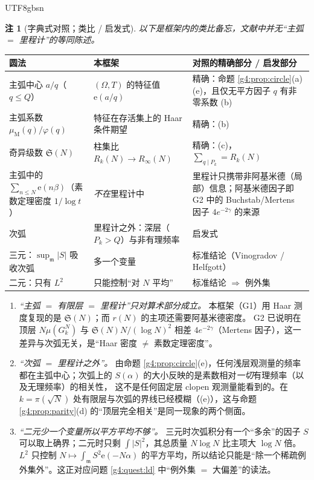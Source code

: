 \documentclass[11pt,a4paper]{article}
\newcommand{\Haar}{\mu}
\newcommand{\Sing}{\mathfrak S}
\newcommand{\Om}{\Omega}               %
\newcommand{\Mob}{\mu_{\mathrm{M}}}    %
\newcommand{\ee}{\mathrm e}
\newcommand{\Min}{\mathfrak m}
\theoremstyle{plain}
\theoremstyle{definition}
\newtheorem{rem}[lem]{注}
\begin{document}
\begin{CJK}{UTF8}{gbsn}
\begin{rem}[字典式对照；类比 / 启发式]\label{g4:rem:dict}
\emph{以下是框架内的类比备忘，文献中并无“主弧 $=$ 里程计”的等同陈述。}
\begin{center}
\begin{tabular}{p{4.6cm}p{4.6cm}p{5.0cm}}
\hline
圆法 & 本框架 & 对照的精确部分 / 启发部分\\
\hline
主弧中心 $a/q$（$q\le Q$） & $(\Om,T)$ 的特征值 $\ee(a/q)$ & 精确：命题 \ref{g4:prop:circle}(a)(e)，且仅无平方因子 $q$ 有非零系数 (b)\\
主弧系数 $\Mob(q)/\varphi(q)$ & 特征在存活集上的 Haar 条件期望 & 精确：(b)\\
奇异级数 $\Sing(N)$ & 柱集比 $R_k(N)\to R_\infty(N)$ & 精确：(c)，$\sum_{q\mid P_k}=R_k(N)$\\
主弧中的 $\sum_{n\le N}\ee(n\beta)$（素数定理密度 $1/\log t$） & \emph{不在}里程计中 & 里程计只携带非阿基米德（局部）信息；阿基米德因子即 G2 中的 Buchstab/Mertens 因子 $4e^{-2\gamma}$ 的来源\\
次弧 & 里程计之外：深层（$P_k>Q$）与非有理频率 & 启发式\\
三元：$\sup_{\Min}|S|$ 吸收次弧 & 多一个变量 & 标准结论（Vinogradov / Helfgott）\\
二元：只有 $L^2$ & 只能控制“对 $N$ 平均” & 标准结论 $\Rightarrow$ 例外集\\
\hline
\end{tabular}
\end{center}
\begin{enumerate}[leftmargin=*,label=(\arabic*)]
\item \emph{“主弧 $=$ 有限层 $=$ 里程计”只对算术部分成立。} 本框架（G1）用 Haar 测度复现的是 $\Sing(N)$；而 $r(N)$ 的主项还需要阿基米德密度。
G2 已说明在顶层 $N\Haar(G_k^N)$ 与 $\Sing(N)N/(\log N)^2$ 相差 $4e^{-2\gamma}$（Mertens 因子），这一差异与次弧无关，是“Haar 密度 $\ne$ 素数定理密度”。
\item \emph{“次弧 $=$ 里程计之外”。} 由命题 \ref{g4:prop:circle}(e)，任何浅层观测量的频率都在主弧中心；次弧上的 $S(\alpha)$ 的大小反映的是素数相对\emph{一切}有理频率（以及无理频率）的相关性，
这不是任何固定层 clopen 观测量能看到的。在 $k=\pi(\sqrt N)$ 处有限层与次弧的界线已经模糊（(e)），这与命题 \ref{g4:prop:parity}(d) 的“顶层完全相关”是同一现象的两个侧面。
\item \emph{“二元少一个变量所以平方平均不够”。} 三元时次弧积分有一个“多余”的因子 $S$ 可以取上确界；二元时只剩 $\int|S|^2$，其总质量 $N\log N$ 比主项大 $\log N$ 倍。
$L^2$ 只控制 $N\mapsto\int_{\Min}S^2\ee(-N\alpha)$ 的平方平均，所以结论只能是“除一个稀疏例外集外”。这正对应问题 \ref{g4:quest:ld} 中“例外集 $=$ 大偏差”的读法。
\end{enumerate}
\end{rem}


\end{CJK}
\end{document}

